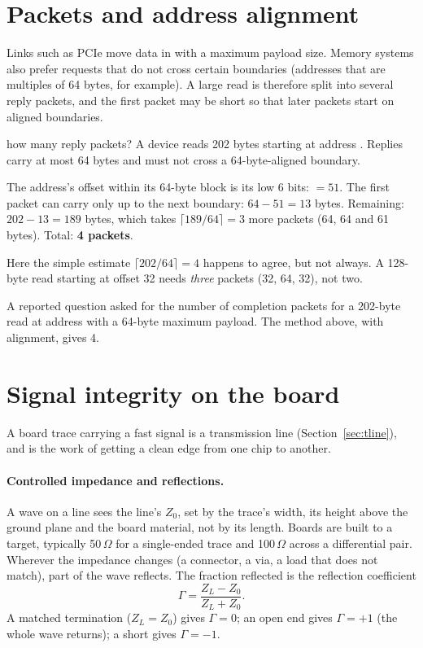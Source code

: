 \section{Packets and address alignment}

Links such as PCIe move data in  with a maximum payload size. Memory systems also prefer requests that do not cross certain  boundaries (addresses that are multiples of 64 bytes, for example). A large read is therefore split into several reply packets, and the first packet may be short so that later packets start on aligned boundaries.

\begin{worked}{how many reply packets?}
A device reads 202 bytes starting at address . Replies carry at most 64 bytes and must not cross a 64-byte-aligned boundary.

The address's offset within its 64-byte block is its low 6 bits:  $= 51$. The first packet can carry only up to the next boundary: $64 - 51 = 13$ bytes. Remaining: $202 - 13 = 189$ bytes, which takes $\lceil 189/64 \rceil = 3$ more packets (64, 64 and 61 bytes). Total: \textbf{4 packets}.

Here the simple estimate $\lceil 202/64 \rceil = 4$ happens to agree, but not always. A 128-byte read starting at offset 32 needs \emph{three} packets (32, 64, 32), not two.
\end{worked}

\begin{onoa}
A reported question asked for the number of completion packets for a 202-byte read at address  with a 64-byte maximum payload. The method above, with alignment, gives 4.
\end{onoa}

\section{Signal integrity on the board}
\label{sec:si}

A board trace carrying a fast signal is a transmission line (Section~\ref{sec:tline}), and  is the work of getting a clean edge from one chip to another.

\paragraph{Controlled impedance and reflections.} A wave on a line sees the line's  $Z_0$, set by the trace's width, its height above the ground plane and the board material, not by its length. Boards are built to a target, typically 50\,$\Omega$ for a single-ended trace and 100\,$\Omega$ across a differential pair. Wherever the impedance changes (a connector, a via, a load that does not match), part of the wave reflects. The fraction reflected is the reflection coefficient
\[ \Gamma = \frac{Z_L - Z_0}{Z_L + Z_0}. \]
A matched termination ($Z_L = Z_0$) gives $\Gamma = 0$; an open end gives $\Gamma = +1$ (the whole wave returns); a short gives $\Gamma = -1$.

